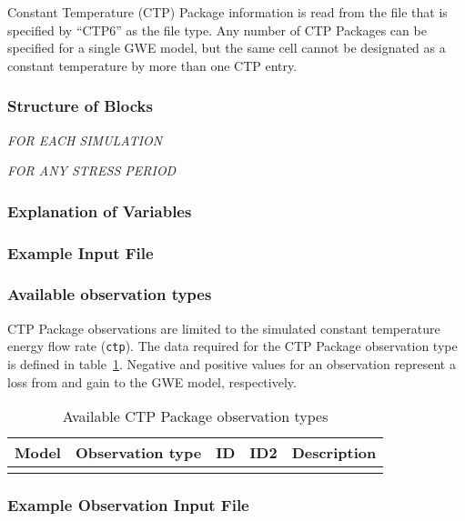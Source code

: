 Constant Temperature (CTP) Package information is read from the file that is specified by ``CTP6'' as the file type.  Any number of CTP Packages can be specified for a single GWE model, but the same cell cannot be designated as a constant temperature by more than one CTP entry. 

\vspace{5mm}
\subsubsection{Structure of Blocks}
\vspace{5mm}

\noindent \textit{FOR EACH SIMULATION}


\vspace{5mm}
\noindent \textit{FOR ANY STRESS PERIOD}

\gwepackageperioddescription

\vspace{5mm}
\subsubsection{Explanation of Variables}
\begin{description}

\end{description}

\vspace{5mm}
\subsubsection{Example Input File}


\vspace{5mm}
\subsubsection{Available observation types}
CTP Package observations are limited to the simulated constant temperature energy flow rate (\texttt{ctp}). The data required for the CTP Package observation type is defined in table~\ref{table:gwe-ctpobstype}. Negative and positive values for an observation represent a loss from and gain to the GWE model, respectively.

\begin{longtable}{p{2cm} p{2.75cm} p{2cm} p{1.25cm} p{7cm}}
\caption{Available CTP Package observation types} \tabularnewline

\hline
\hline
\textbf{Model} & \textbf{Observation type} & \textbf{ID} & \textbf{ID2} & \textbf{Description} \\
\hline
\endhead

\hline
\endfoot


\label{table:gwe-ctpobstype}
\end{longtable}

\vspace{5mm}
\subsubsection{Example Observation Input File}

